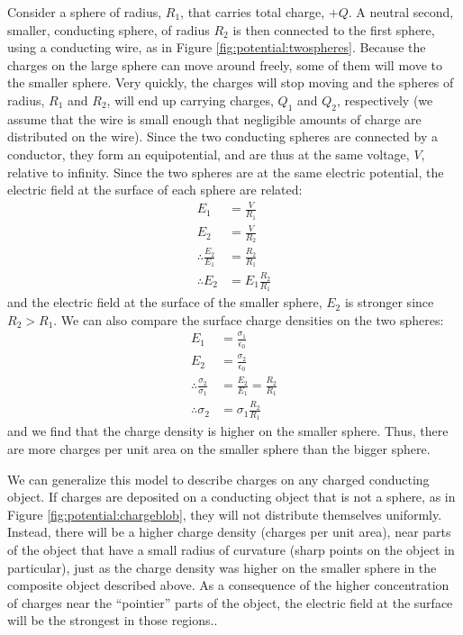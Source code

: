 Consider a sphere of radius, $R_1$, that carries total charge, $+Q$. A neutral second, smaller, conducting sphere, of radius $R_2$ is then connected to the first sphere, using a conducting wire, as in Figure \ref{fig:potential:twospheres}.
Because the charges on the large sphere can move around freely, some of them will move to the smaller sphere. Very quickly, the charges will stop moving and the spheres of radius, $R_1$ and $R_2$, will end up carrying charges, $Q_1$ and $Q_2$, respectively (we assume that the wire is small enough that negligible amounts of charge are distributed on the wire). Since the two conducting spheres are connected by a conductor, they form an equipotential, and are thus at the same voltage, $V$, relative to infinity. Since the two spheres are at the same electric potential, the electric field at the surface of each sphere are related:
\begin{align*}
E_1&=\frac{V}{R_1}\\
E_2&=\frac{V}{R_2}\\
\therefore \frac{E_2}{E_1}&=\frac{R_2}{R_1}\\
\therefore E_2&=E_1\frac{R_2}{R_1}
\end{align*}
and the electric field at the surface of the smaller sphere, $E_2$ is stronger since $R_2>R_1$. We can also compare the surface charge densities on the two spheres:
\begin{align*}
E_1&=\frac{\sigma_1}{\epsilon_0}\\
E_2&=\frac{\sigma_2}{\epsilon_0}\\
\therefore \frac{\sigma_2}{\sigma_1}&=\frac{E_2}{E_1}=\frac{R_2}{R_1}\\
\therefore \sigma_2&=\sigma_1 \frac{R_2}{R_1}
\end{align*}
and we find that the charge density is higher on the smaller sphere. Thus, there are more charges per unit area on the smaller sphere than the bigger sphere.

We can generalize this model to describe charges on any charged conducting object. If charges are deposited on a conducting object that is not a sphere, as in Figure \ref{fig:potential:chargeblob}, they will not distribute themselves uniformly. Instead, there will be a higher charge density (charges per unit area), near parts of the object that have a small radius of curvature (sharp points on the object in particular), just as the charge density was higher on the smaller sphere in the composite object described above. As a consequence of the higher concentration of charges near the ``pointier'' parts of the object, the electric field at the surface will be the strongest in those regions.. 

